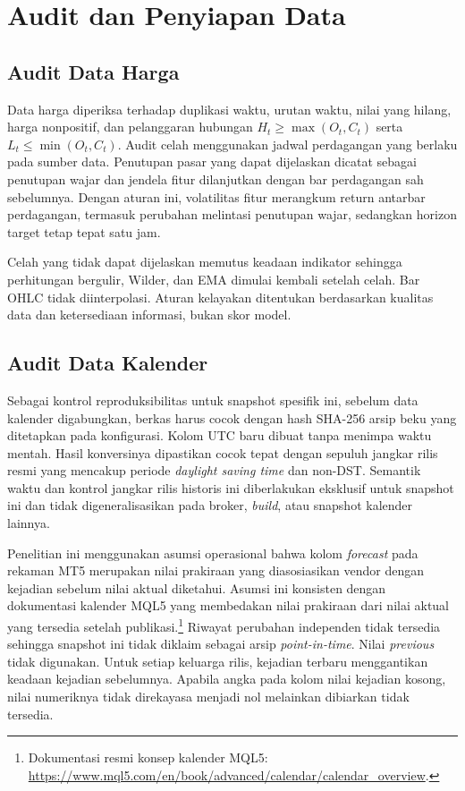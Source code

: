 \section{Audit dan Penyiapan Data}

\subsection{Audit Data Harga}

Data harga diperiksa terhadap duplikasi waktu, urutan waktu, nilai yang hilang, harga nonpositif, dan pelanggaran hubungan $H_t\geq\max(O_t,C_t)$ serta $L_t\leq\min(O_t,C_t)$. Audit celah menggunakan jadwal perdagangan yang berlaku pada sumber data. Penutupan pasar yang dapat dijelaskan dicatat sebagai penutupan wajar dan jendela fitur dilanjutkan dengan bar perdagangan sah sebelumnya. Dengan aturan ini, volatilitas fitur merangkum return antarbar perdagangan, termasuk perubahan melintasi penutupan wajar, sedangkan horizon target tetap tepat satu jam.

Celah yang tidak dapat dijelaskan memutus keadaan indikator sehingga perhitungan bergulir, Wilder, dan EMA dimulai kembali setelah celah. Bar OHLC tidak diinterpolasi. Aturan kelayakan ditentukan berdasarkan kualitas data dan ketersediaan informasi, bukan skor model.

\subsection{Audit Data Kalender}
\label{subsec:audit-kalender}

Sebagai kontrol reproduksibilitas untuk snapshot spesifik ini, sebelum data kalender digabungkan, berkas harus cocok dengan hash SHA-256 arsip beku yang ditetapkan pada konfigurasi. Kolom UTC baru dibuat tanpa menimpa waktu mentah. Hasil konversinya dipastikan cocok tepat dengan sepuluh jangkar rilis resmi yang mencakup periode \emph{daylight saving time} dan non-DST. Semantik waktu dan kontrol jangkar rilis historis ini diberlakukan eksklusif untuk snapshot ini dan tidak digeneralisasikan pada broker, \emph{build}, atau snapshot kalender lainnya.

Penelitian ini menggunakan asumsi operasional bahwa kolom \emph{forecast} pada rekaman MT5 merupakan nilai prakiraan yang diasosiasikan vendor dengan kejadian sebelum nilai aktual diketahui. Asumsi ini konsisten dengan dokumentasi kalender MQL5 yang membedakan nilai prakiraan dari nilai aktual yang tersedia setelah publikasi.\footnote{Dokumentasi resmi konsep kalender MQL5: \url{https://www.mql5.com/en/book/advanced/calendar/calendar_overview}.} Riwayat perubahan independen tidak tersedia sehingga snapshot ini tidak diklaim sebagai arsip \emph{point-in-time}. Nilai \emph{previous} tidak digunakan. Untuk setiap keluarga rilis, kejadian terbaru menggantikan keadaan kejadian sebelumnya. Apabila angka pada kolom nilai kejadian kosong, nilai numeriknya tidak direkayasa menjadi nol melainkan dibiarkan tidak tersedia.

